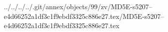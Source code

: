 ../../../../.git/annex/objects/99/zv/MD5E-s5207--e4d66252a1df3c1f9ebdf3325c886e27.tex/MD5E-s5207--e4d66252a1df3c1f9ebdf3325c886e27.tex